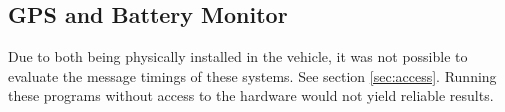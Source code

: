 \subsection{GPS and Battery Monitor}

Due to both being physically installed in the vehicle, it was not possible to evaluate the message timings of these systems. See section \ref{sec:access}. Running these programs without access to the hardware would not yield reliable results.




